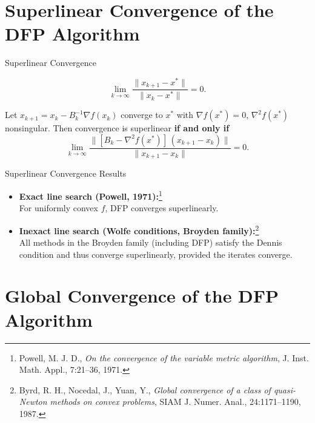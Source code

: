 \documentclass[aspectratio=169]{beamer}
\begin{document}
	\section{Superlinear Convergence of the DFP Algorithm}
	
	\begin{frame}{Superlinear Convergence}
		\begin{definition}
			\[
			\lim_{k\to\infty} \frac{\|x_{k+1}-x^*\|}{\|x_k-x^*\|} = 0.
			\]
		\end{definition}
		
		\begin{theorem}\footnotemark
			Let $x_{k+1}=x_k - B_k^{-1}\nabla f(x_k)$ converge to $x^*$ with $\nabla f(x^*)=0$, $\nabla^2 f(x^*)$ nonsingular. Then convergence is superlinear \textbf{if and only if}
			\[
			\lim_{k\to\infty} \frac{\|[B_k - \nabla^2 f(x^*)]\,(x_{k+1}-x_k)\|}{\|x_{k+1}-x_k\|}=0.
			\]
		\end{theorem}
	\end{frame}
	
	\begin{frame}{Superlinear Convergence Results}
		\begin{itemize}
			\item \textbf{Exact line search (Powell, 1971):}\footnote{Powell, M. J. D., \emph{On the convergence of the variable metric algorithm}, J. Inst. Math. Appl., 7:21–36, 1971.} \\
			For uniformly convex $f$, DFP converges superlinearly.
			
			\item \textbf{Inexact line search (Wolfe conditions, Broyden family):}\footnote{Byrd, R. H., Nocedal, J., Yuan, Y., \emph{Global convergence of a class of quasi-Newton methods on convex problems}, SIAM J. Numer. Anal., 24:1171–1190, 1987.} \\
			All methods in the Broyden family (including DFP) satisfy the Dennis condition and thus converge superlinearly, provided the iterates converge.
		\end{itemize}
	\end{frame}
	
	\section{Global Convergence of the DFP Algorithm}
	
\end{document}
